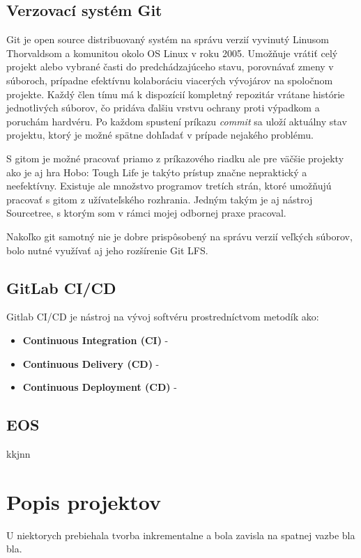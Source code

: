 \documentclass[slovak,bachelorpractice,dept460,male,csharp,cpdeclaration]{diploma}
\begin{document}
\subsection{Verzovací systém Git}
\label{sec:Git}
Git \cite{ProGit} je open source distribuovaný systém na správu verzií vyvinutý Linusom Thorvaldsom a komunitou okolo OS Linux v roku 2005. Umožňuje vrátiť celý projekt alebo vybrané časti do predchádzajúceho stavu, porovnávať zmeny v súboroch, prípadne efektívnu kolaboráciu viacerých vývojárov na spoločnom projekte. Každý člen tímu má k dispozícií kompletný repozitár vrátane histórie jednotlivých súborov, čo pridáva ďalšiu vrstvu ochrany proti výpadkom a poruchám hardvéru. Po každom spustení príkazu \textit{commit} sa uloží aktuálny stav projektu, ktorý je možné spätne dohľadať v prípade nejakého problému.

S gitom je možné pracovať priamo z príkazového riadku ale pre väčšie projekty ako je aj hra Hobo: Tough Life je takýto prístup značne nepraktický a neefektívny. Existuje ale množstvo programov tretích strán, ktoré umožňujú pracovať s gitom z užívateľského rozhrania. Jedným takým je aj nástroj Sourcetree, s ktorým som v rámci mojej odbornej praxe pracoval.

Nakoľko git samotný nie je dobre prispôsobený na správu verzií veľkých súborov, bolo nutné využívať aj jeho rozšírenie Git LFS. 
\subsection{GitLab CI/CD}
\label{sec:GitLab}
Gitlab CI/CD je nástroj na vývoj softvéru prostredníctvom metodík ako:
\begin{itemize}
  \item \textbf{Continuous Integration (CI)} - 
  \item \textbf{Continuous Delivery (CD)} - 
  \item \textbf{Continuous Deployment (CD)} - 
\end{itemize}

\subsection{EOS}
\label{sec:Eos}
kkjnn

\section{Popis projektov}
\label{sec:Projects}
U niektorych prebiehala tvorba inkrementalne a bola zavisla na spatnej vazbe bla bla.

\printbibliography[title={Literatúra}, heading=bibintoc]
\end{document}
